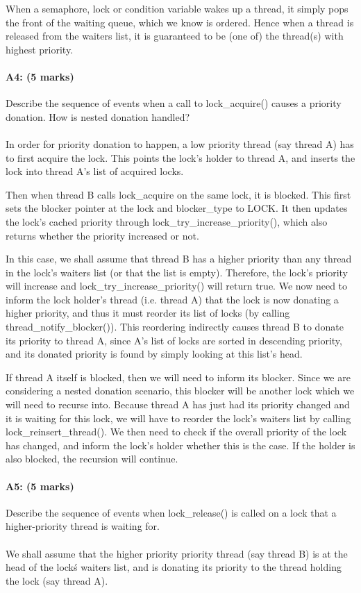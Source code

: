 When a semaphore, lock or condition variable wakes up a thread, it simply pops the front of the waiting queue, which we know is ordered. Hence when a thread is released from the waiters list, it is guaranteed to be (one of) the thread(s) with highest priority.

\paragraph{A4: (5 marks)}
Describe the sequence of events when a call to lock\_acquire() causes a priority donation.  How is nested donation handled?
\\
\\
In order for priority donation to happen, a low priority thread (say thread A) has to first acquire the lock. This points the lock's holder to thread A, and inserts the lock into thread A's list of acquired locks.

Then when thread B calls lock\_acquire on the same lock, it is blocked. This first sets the blocker pointer at the lock and blocker\_type to LOCK. It then updates the lock's cached priority through lock\_try\_increase\_priority(), which also returns whether the priority increased or not.

In this case, we shall assume that thread B has a higher priority than any thread in the lock's waiters list (or that the list is empty). Therefore, the lock's priority will increase and lock\_try\_increase\_priority() will return true. We now need to inform the lock holder's thread (i.e. thread A) that the lock is now donating a higher priority, and thus it must reorder its list of locks (by calling thread\_notify\_blocker()). This reordering indirectly causes thread B to donate its priority to thread A, since A's list of locks are sorted in descending priority, and its donated priority is found by simply looking at this list's head.

If thread A itself is blocked, then we will need to inform its blocker. Since we are considering a nested donation scenario, this blocker will be another lock which we will need to recurse into. Because thread A has just had its priority changed and it is waiting for this lock, we will have to reorder the lock's waiters list by calling lock\_reinsert\_thread(). We then need to check if the overall priority of the lock has changed, and inform the lock's holder whether this is the case. If the holder is also blocked, the recursion will continue.

\paragraph{A5: (5 marks)}
Describe the sequence of events when lock\_release() is called on a lock that a higher-priority thread is waiting for.
\\
\\
We shall assume that the higher priority priority thread (say thread B) is at the head of the lock\'s waiters list, and is donating its priority to the thread holding the lock (say thread A).

